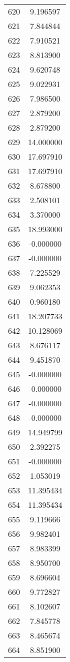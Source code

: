 \documentclass[12pt]{article}
\begin{document}
\begin{longtable}{@{}cc@{}}
620 & 9.196597 \\
621 & 7.844844 \\
622 & 7.910521 \\
623 & 8.813900 \\
624 & 9.620748 \\
625 & 9.022931 \\
626 & 7.986500 \\
627 & 2.879200 \\
628 & 2.879200 \\
629 & 14.000000 \\
630 & 17.697910 \\
631 & 17.697910 \\
632 & 8.678800 \\
633 & 2.508101 \\
634 & 3.370000 \\
635 & 18.993000 \\
636 & -0.000000 \\
637 & -0.000000 \\
638 & 7.225529 \\
639 & 9.062353 \\
640 & 0.960180 \\
641 & 18.207733 \\
642 & 10.128069 \\
643 & 8.676117 \\
644 & 9.451870 \\
645 & -0.000000 \\
646 & -0.000000 \\
647 & -0.000000 \\
648 & -0.000000 \\
649 & 14.949799 \\
650 & 2.392275 \\
651 & -0.000000 \\
652 & 1.053019 \\
653 & 11.395434 \\
654 & 11.395434 \\
655 & 9.119666 \\
656 & 9.982401 \\
657 & 8.983399 \\
658 & 8.950700 \\
659 & 8.696604 \\
660 & 9.772827 \\
661 & 8.102607 \\
662 & 7.845778 \\
663 & 8.465674 \\
664 & 8.851900 \\

\end{longtable}
\end{document}
